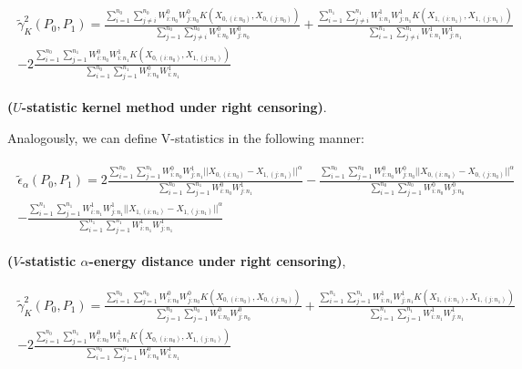 \documentclass[11pt]{article}
\begin{document}
\begin{gather}\label{eqn:estadistico2}
\begin{align}
\tilde{\gamma}_K^{2}(P_0,P_1)=  \frac{\sum_{i=1}^{n_0}  \sum_{j\neq i}^{n_0} W^{0}_{i:n_0} W^{0}_{j:n_0} K(X_{0,(i:n_0)},X_{0,(j:n_0)})}{ \sum_{j=1}^{n_0} \sum_{j\neq i}^{n_0} W^{0}_{i:n_0} W^{0}_{j:n_0}}+ \frac{\sum_{i=1}^{n_1}  \sum_{j\neq i}^{n_1} W^{1}_{i:n_1} W^{1}_{j:n_1}  K(X_{1,(i:n_1)},X_{1,(j:n_1)})}{\sum_{i=1}^{n_1}  \sum_{j\neq i }^{n_1}W^{1}_{i:n_1} W^{1}_{j:n_1}}\\-2\frac{\sum_{i=1}^{n_0}  \sum_{j=1}^{n_1} W^{0}_{i:n_0} W^{1}_{i:n_1} K(X_{0,(i:n_0)},X_{1,(j:n_1)})}{\sum_{i=1}^{n_0}  \sum_{j=1}^{n_1} W^{0}_{i:n_0} W^{1}_{i:n_1}} \nonumber
\end{align}
\end{gather}


\textbf{($U$-statistic kernel method under right censoring)}.

Analogously, we can define V-statistics in the following manner: 


\begin{gather}\label{eqn:estadistico3}
\begin{align}
\tilde{\epsilon}_{\alpha}(P_0,P_1)= 2  \frac{\sum_{i=1}^{n_0}  \sum_{j=1}^{n_1} W^{0}_{i:n_0} W^{1}_{j:n_1} ||X_{0,(i:n_0)}-X_{1,(j:n_1)}||^{\alpha}}{\sum_{i=1}^{n_0}  \sum_{j=1}^{n_1} W^{0}_{i:n_0} W^{1}_{j:n_1}} - \frac{\sum_{i=1}^{n_0} \sum_{j=1 }^{n_0}  W^{0}_{i:n_0} W^{0}_{j:n_0}  ||X_{0,(i:n_0)}-X_{0,(j:n_0)}||^{\alpha}}{\sum_{i=1}^{n_0} \sum_{j= 1}^{n_0} W^{0}_{i:n_0} W^{0}_{j:n_0}} \\
- \frac{\sum_{i=1}^{n_1}  \sum_{j=1}^{n_1} W^{1}_{i:n_1} W^{1}_{j:n_1}  ||X_{1,(i:n_1)}-X_{1,(j:n_1)}||^{\alpha}}{\sum_{i=1}^{n_1}  \sum_{j=1}^{n_1} W^{1}_{i:n_1} W^{1}_{j:n_1}} \nonumber
\end{align}
\end{gather}

\textbf{($V$-statistic $\alpha$-energy distance under right censoring)},

\begin{gather}\label{eqn:estadistico4}
\begin{align}
\tilde{\gamma}_K^{2}(P_0,P_1)=  \frac{\sum_{i=1}^{n_0}  \sum_{j=1}^{n_0} W^{0}_{i:n_0} W^{0}_{j:n_0} K(X_{0,(i:n_0)},X_{0,(j:n_0)})}{ \sum_{j=1}^{n_0} \sum_{j=1}^{n_0} W^{0}_{i:n_0} W^{0}_{j:n_0}}+ \frac{\sum_{i=1}^{n_1}  \sum_{j=1}^{n_1} W^{1}_{i:n_1} W^{1}_{j:n_1}  K(X_{1,(i:n_1)},X_{1,(j:n_1)})}{\sum_{i=1}^{n_1}  \sum_{j=1 }^{n_1}W^{1}_{i:n_1} W^{1}_{j:n_1}}\\-2\frac{\sum_{i=1}^{n_0}  \sum_{j=1}^{n_1} W^{0}_{i:n_0} W^{1}_{i:n_1} K(X_{0,(i:n_0)},X_{1,(j:n_1)})}{\sum_{i=1}^{n_0}  \sum_{j=1}^{n_1} W^{0}_{i:n_0} W^{1}_{i:n_1}} \nonumber
\end{align}
\end{gather}
\end{document}

